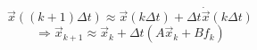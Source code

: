 \documentclass{article}
\begin{document}
\thispagestyle{empty}

$$
\vec{x}((k+1)\Delta t) \approx \vec{x}(k\Delta t) + \Delta t \dot{\vec{x}}(k\Delta t)
$$
$$
\Rightarrow \vec{x}_{k+1} \approx \vec{x}_k + \Delta t (A\vec{x}_k + B f_k)
$$
\end{document}
